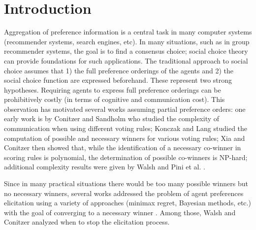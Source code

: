 \documentclass[runningheads]{llncs}
\theoremstyle{remark}
\begin{document}
\section{Introduction}
Aggregation of preference information is a central task in many computer systems (recommender systems, search engines, etc).
In many situations, such as in group recommender systems, the goal is to find a consensus choice;
social choice theory can provide foundations for such applications.
The traditional approach to social choice assumes that 1) the full preference orderings of the agents and 2) the social choice function are expressed beforehand. These represent two strong hypotheses.
Requiring agents to express full preference orderings can be prohibitively costly (in terms of cognitive and communication cost).
This observation has motivated several works assuming partial preference orders: 
one early work is  by Conitzer and Sandholm \cite{Conitzer2005} who studied the complexity of communication when using different voting rules; %
Konczak and Lang \cite{Konczak05} studied the computation of possible and necessary winners for various voting rules; %
Xia and Conitzer \cite{Xia2008} then showed that, while the identification of a necessary co-winner in scoring rules is polynomial,  the determination of possible co-winners is NP-hard;
additional complexity results were given by Walsh \cite{Walsh2007} and Pini et al. \cite{Pini2007}.

Since in many practical situations there would be too many possible winners but no necessary winners, several works addressed the problem of agent preferences elicitation using a variety of approaches (minimax regret, Bayesian methods, etc.) with the goal of converging to a necessary winner \cite{Naamani-Dery2015,Kalech2011,Lu2011,Pini2009,Benabbou2016,Dey2016_2}. Among those, Walsh \cite{Walsh2009} and Conitzer \cite{Conitzer2009} analyzed when to stop the elicitation process.
\end{document}
